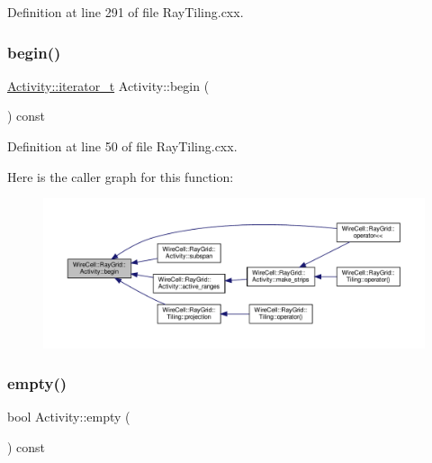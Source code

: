 Definition at line 291 of file Ray\+Tiling.\+cxx.

\mbox{\label{class_wire_cell_1_1_ray_grid_1_1_activity_abb7e7e8dd7757d7efbd31b3f85f2a69a}} 
\subsubsection{\texorpdfstring{begin()}{begin()}}
{\footnotesize\ttfamily \hyperlink{class_wire_cell_1_1_ray_grid_1_1_activity_a4e6dc9c676d517a5819962b10a2638fe}{Activity\+::iterator\+\_\+t} Activity\+::begin (\begin{DoxyParamCaption}{ }\end{DoxyParamCaption}) const}



Definition at line 50 of file Ray\+Tiling.\+cxx.

Here is the caller graph for this function\+:
\nopagebreak
\begin{figure}[H]
\begin{center}
\leavevmode
\includegraphics[width=350pt]{class_wire_cell_1_1_ray_grid_1_1_activity_abb7e7e8dd7757d7efbd31b3f85f2a69a_icgraph}
\end{center}
\end{figure}
\mbox{\label{class_wire_cell_1_1_ray_grid_1_1_activity_a3b387437e1942ce62001daa39cd1631f}} 
\subsubsection{\texorpdfstring{empty()}{empty()}}
{\footnotesize\ttfamily bool Activity\+::empty (\begin{DoxyParamCaption}{ }\end{DoxyParamCaption}) const}



